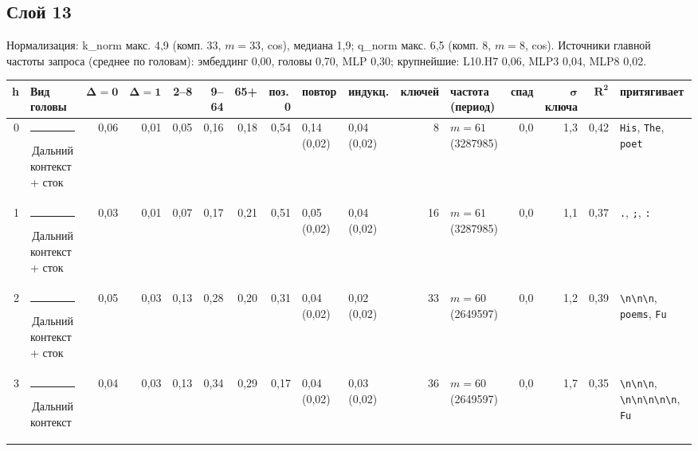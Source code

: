 \documentclass[10pt]{article}
\begin{document}
\noindent\begin{minipage}{\linewidth}
\subsection*{Слой 13}
{\small\color{ink2} Нормализация: k\_norm макс. 4,9 (комп. 33, $m{=}33$, cos), медиана 1,9; q\_norm макс. 6,5 (комп. 8, $m{=}8$, cos). Источники главной частоты запроса (среднее по головам): эмбеддинг 0,00, головы 0,70, MLP 0,30; крупнейшие: L10.H7 0,06, MLP3 0,04, MLP8 0,02.}
\begin{center}{\footnotesize\begin{tabular}{|r|l|r|r|r|r|r|r|l|l|r|l|r|r|r|l|}
\hline
\rowcolor{head}\textbf{h} & \textbf{Вид головы} & $\boldsymbol{\Delta{=}0}$ & $\boldsymbol{\Delta{=}1}$ & \textbf{2–8} & \textbf{9–64} & \textbf{65+} & \textbf{поз.\,0} & \textbf{повтор} & \textbf{индукц.} & \textbf{ключей} & \textbf{частота (период)} & \textbf{спад} & $\boldsymbol{\sigma}$ \textbf{ключа} & $\boldsymbol{R^2}$ & \textbf{притягивает} \\ \hline
0 & \textcolor[HTML]{C3C2B7}{\rule{0.62em}{0.62em}}\,Дальний контекст + сток & 0,06 & 0,01 & 0,05 & 0,16 & 0,18 & 0,54 & 0,14 (0,02) & 0,04 (0,02) & 8 & $m{=}61$ (3287985) & 0,0 & 1,3 & 0,42 & \texttt{\textvisiblespace{}His}, \texttt{\textvisiblespace{}The}, \texttt{\textvisiblespace{}poet} \\ \hline
1 & \textcolor[HTML]{C3C2B7}{\rule{0.62em}{0.62em}}\,Дальний контекст + сток & 0,03 & 0,01 & 0,07 & 0,17 & 0,21 & 0,51 & 0,05 (0,02) & 0,04 (0,02) & 16 & $m{=}61$ (3287985) & 0,0 & 1,1 & 0,37 & \texttt{\textvisiblespace{}.}, \texttt{\textvisiblespace{};}, \texttt{\textvisiblespace{}:} \\ \hline
2 & \textcolor[HTML]{C3C2B7}{\rule{0.62em}{0.62em}}\,Дальний контекст + сток & 0,05 & 0,03 & 0,13 & 0,28 & 0,20 & 0,31 & 0,04 (0,02) & 0,02 (0,02) & 33 & $m{=}60$ (2649597) & 0,0 & 1,2 & 0,39 & \texttt{\textvisiblespace{}\textbackslash{}n\textbackslash{}n\textbackslash{}n}, \texttt{\textvisiblespace{}poems}, \texttt{\textvisiblespace{}Fu} \\ \hline
3 & \textcolor[HTML]{C3C2B7}{\rule{0.62em}{0.62em}}\,Дальний контекст & 0,04 & 0,03 & 0,13 & 0,34 & 0,29 & 0,17 & 0,04 (0,02) & 0,03 (0,02) & 36 & $m{=}60$ (2649597) & 0,0 & 1,7 & 0,35 & \texttt{\textvisiblespace{}\textbackslash{}n\textbackslash{}n\textbackslash{}n}, \texttt{\textvisiblespace{}\textbackslash{}n\textbackslash{}n\textbackslash{}n\textbackslash{}n\textbackslash{}n}, \texttt{\textvisiblespace{}Fu} \\ \hline

\end{tabular}}
\end{center}
\end{minipage}
\end{document}
